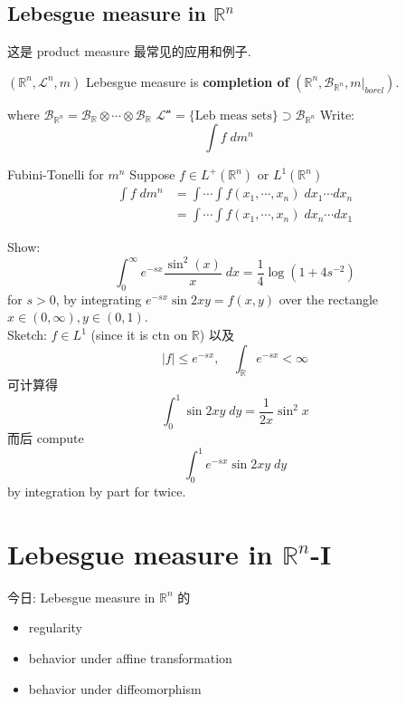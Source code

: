 \documentclass[lang=cn,11pt]{elegantbook}
\begin{document}
\section{Lebesgue measure in $\mathbb{R}^n$}
这是 product measure 最常见的应用和例子. 
\begin{definition}
    $(\mathbb{R}^n, \mathcal{L}^n, m)$ Lebesgue measure is \textbf{completion of } $(\mathbb{R}^n, \mathcal{B}_{\mathbb{R}^n}, m|_{borel})$. 
\end{definition}
where $ \mathcal{B}_{\mathbb{R}^n} =  \mathcal{B}_{\mathbb{R}} \otimes \cdots \otimes \mathcal{B}_{\mathbb{R}}  $
\(\mathcal{L^n }  = \{ \text{Leb meas sets} \}  \supset  \mathcal{B}_{\mathbb{R}^n}\)
Write: \[  \int f \;d m^n   \quad 
\]


\begin{theorem}{Fubini-Tonelli for $m^n$}
    Suppose $f \in L^+(\mathbb{R}^n)$ or $L^1(\mathbb{R}^n)$
\begin{align}
\int f \; dm^n &= \int \cdots \int f(x_1, \cdots, x_n) 
\; dx_1 \cdots dx_n        \\
& = \int \cdots \int f(x_1, \cdots, x_n) 
\; dx_n \cdots dx_1
\end{align}
\end{theorem}

\begin{example}
    Show: \[
    \int_0^\infty e^{-sx} \frac{\sin^2(x)}{x} \; dx = \frac{1}{4} \log(1+ 4s^{-2})
    \]
for $s > 0$, by integrating $e^{-sx} \sin 2xy = f(x,y)$ over the rectangle $x \in (0,\infty), y \in (0,1)$.\\
Sketch: $f \in L^1$ (since it is ctn on $\mathbb{R}$)
以及 \[
|f| \leq e^{-sx}, \quad \int_{\mathbb{R}} e^{-sx} < \infty
\]
可计算得 \[
\int_0 ^1 \sin 2xy \; dy = \frac{1}{2x} \sin^2 x
\]
而后 compute \[
\int_0 ^1    e^{-sx} \sin 2xy \; dy
\] by integration by part for twice.
\end{example}












\chapter{Lebesgue measure in $\mathbb{R}^n$-I}
今日: Lebesgue measure in $\mathbb{R}^n$ 的 \begin{itemize}
    \item regularity
    \item behavior under affine transformation
    \item behavior under diffeomorphism
\end{itemize}
\end{document}
